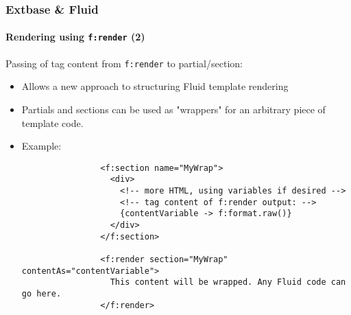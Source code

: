 
\begin{frame}[fragile]
	\frametitle{Extbase \& Fluid}
	\framesubtitle{Rendering using \texttt{f:render} (2)}

	\lstset{basicstyle=\tiny\ttfamily}

	Passing of tag content from \texttt{f:render} to partial/section:

	\begin{itemize}

		\item Allows a new approach to structuring Fluid template rendering

		\item Partials and sections can be used as "wrappers" for an arbitrary
			piece of template code.

		\item Example:

			\begin{lstlisting}
				<f:section name="MyWrap">
				  <div>
				    <!-- more HTML, using variables if desired -->
				    <!-- tag content of f:render output: -->
				    {contentVariable -> f:format.raw()}
				  </div>
				</f:section>

				<f:render section="MyWrap" contentAs="contentVariable">
				  This content will be wrapped. Any Fluid code can go here.
				</f:render>
			\end{lstlisting}

	\end{itemize}

\end{frame}


